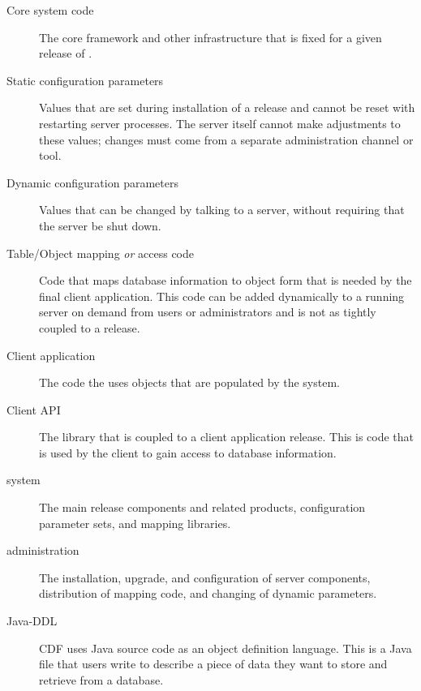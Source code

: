 \begin{description}

\item[Core system code]

The core framework and other infrastructure that is fixed for a given
release of \frontier.

\item[Static configuration parameters]

Values that are set during installation of a release and cannot be
reset with restarting server processes. The server itself cannot make
adjustments to these values; changes must come from a separate
administration channel or tool.

\item[Dynamic configuration parameters]

Values that can be changed by talking to a server, without requiring
that the server be shut down.

\item[Table/Object mapping \textit{or} access code]

Code that maps database information to object form that is needed by
the final client application. This code can be added dynamically to a
running server on demand from users or administrators and is not as
tightly coupled to a \frontier release.

\item[Client application]

The code the uses objects that are populated by the \frontier system.

\item[Client API]

The library that is coupled to a client application release. This is
code that is used by the client to gain access to database
information.

\item[\frontier system]

The main release components and related products, configuration
parameter sets, and mapping libraries.


\item[\frontier administration]

The installation, upgrade, and configuration of server components,
distribution of mapping code, and changing of dynamic parameters.

\item[Java-DDL]

CDF uses Java source code as an object definition language. This is a
Java file that users write to describe a piece of data they want to
store and retrieve from a database.


\end{description}
